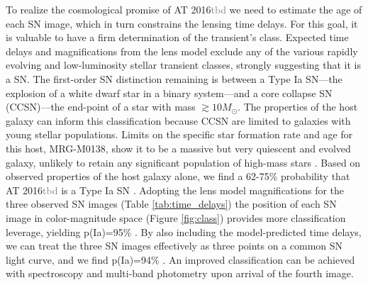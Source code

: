 \documentclass[12pt,dvipsnames]{article}
\def\SNABC{AT 2016{\textcolor{Gray}{tbd}}\xspace}
\begin{document}
 
To realize the cosmological promise of \SNABC 
we need to estimate the age of each SN image, which in turn constrains the lensing time delays. For this
goal, it is valuable to have a firm determination of the transient’s class. Expected time delays and magnifications from the lens model exclude any of the various rapidly evolving and low-luminosity stellar transient classes, strongly suggesting that it is a SN. The first-order SN distinction remaining is between a Type Ia SN---the explosion of a white dwarf star in a binary system---and a core collapse SN (CCSN)---the end-point of a star with mass $\gtrsim 10 M_{\odot}$. 
The properties of the host galaxy can inform this classification because CCSN are limited to galaxies with young stellar populations. Limits on the specific star formation rate and age for this host, MRG-M0138, show it to be a massive but very quiescent and evolved galaxy, %
unlikely to retain any significant population of high-mass stars \cite{newman_resolving_2018}. Based on observed properties of the host galaxy alone, we find a 62-75\% probability that \SNABC is a Type Ia SN \cite{materials_methods_2020}. Adopting the lens model magnifications for the three observed SN images (Table \ref{tab:time_delays}) the position of each SN image in color-magnitude space (Figure \ref{fig:class}) provides more classification leverage, yielding p(Ia)=95\% \cite{materials_methods_2020}. By also including the model-predicted time delays, we can treat the three SN images effectively as three points on a common SN light curve, and we find p(Ia)=94\% \cite{materials_methods_2020}.
An improved classification can be achieved with spectroscopy and multi-band photometry upon arrival of the fourth image.


\end{document}
